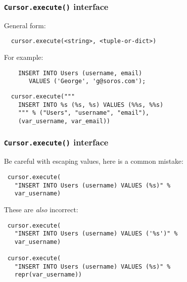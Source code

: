 \documentclass{beamer}
\begin{document}
\begin{frame}[fragile]
  \frametitle{\texttt{Cursor.execute()} interface}

  General form:
\begin{verbatim}
  cursor.execute(<string>, <tuple-or-dict>)
\end{verbatim}

\vfill

  For example:

\begin{verbatim}
    INSERT INTO Users (username, email) 
       VALUES ('George', 'g@soros.com');
\end{verbatim}

\begin{verbatim}
  cursor.execute("""
    INSERT INTO %s (%s, %s) VALUES (%%s, %%s)
    """ % ("Users", "username", "email"),
    (var_username, var_email))
\end{verbatim}

\end{frame}


\begin{frame}[fragile]
  \frametitle{\texttt{Cursor.execute()} interface}

  Be careful with escaping values, here is a common mistake:
\begin{verbatim}
 cursor.execute(
   "INSERT INTO Users (username) VALUES (%s)" % 
   var_username)
\end{verbatim}

  These are \emph{also} incorrect:
\begin{verbatim}
 cursor.execute(
   "INSERT INTO Users (username) VALUES ('%s')" % 
   var_username)

 cursor.execute(
   "INSERT INTO Users (username) VALUES (%s)" % 
   repr(var_username))
\end{verbatim}

\end{frame}
\end{document}
